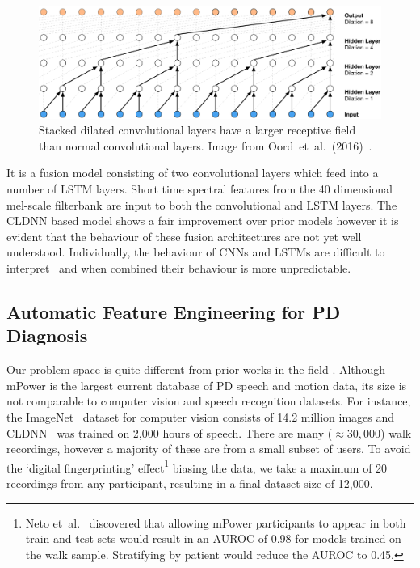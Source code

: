 \documentclass[12pt, twoside]{book}
\begin{document}
\begin{figure}[h]
	\label{wavenet}
	\centering\centerline{\includegraphics[width=1\linewidth]{wavenet.png}}
	\caption{Stacked dilated convolutional layers have a larger receptive field than normal convolutional layers. Image from Oord~et~al.~(2016)~\cite{wavenet}.}
\end{figure}

It is a fusion model consisting of two convolutional layers which feed into a number of LSTM layers. Short time spectral features from the 40 dimensional mel-scale filterbank are input to both the convolutional and LSTM layers. The CLDNN based model shows a fair improvement over prior models however it is evident that the behaviour of these fusion architectures are not yet well understood. Individually, the behaviour of CNNs and LSTMs are difficult to interpret~\cite{cnnvis, visualisernn} and when combined their behaviour is more unpredictable.


\subsection{Automatic Feature Engineering for PD Diagnosis}

Our problem space is quite different from prior works in the field . Although mPower is the largest current database of PD speech and motion data, its size is not comparable to computer vision and speech recognition datasets. For instance, the ImageNet~\cite{imagenet} dataset for computer vision consists of 14.2 million images and CLDNN~\cite{convlstm} was trained on 2,000 hours of speech. There are many ($\approx30,000$) walk recordings, however a majority of these are from a small subset of users. To avoid the `digital fingerprinting' effect\footnote{Neto et~al.~\cite{mpowerneto2017analysis} discovered that allowing mPower participants to appear in both train and test sets would result in an AUROC of 0.98 for models trained on the walk sample. Stratifying by patient would reduce the AUROC to 0.45.} biasing the data, we take a maximum of 20 recordings from any participant, resulting in a final dataset size of 12,000.
\end{document}
